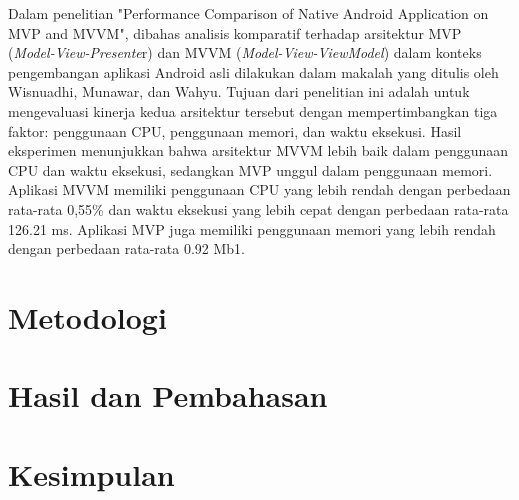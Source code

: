\documentclass[conference]{IEEEtran}
\begin{document}
	Dalam penelitian "Performance Comparison of Native Android Application on MVP and MVVM"\cite{[Perbandingan3]}, dibahas analisis komparatif terhadap arsitektur MVP (\textit{Model-View-Presente}r) dan MVVM (\textit{Model-View-ViewModel}) dalam konteks pengembangan aplikasi Android asli dilakukan dalam makalah yang ditulis oleh Wisnuadhi, Munawar, dan Wahyu. Tujuan dari penelitian ini adalah untuk mengevaluasi kinerja kedua arsitektur tersebut dengan mempertimbangkan tiga faktor: penggunaan CPU, penggunaan memori, dan waktu eksekusi. Hasil eksperimen menunjukkan bahwa arsitektur MVVM lebih baik dalam penggunaan CPU dan waktu eksekusi, sedangkan MVP unggul dalam penggunaan memori. Aplikasi MVVM memiliki penggunaan CPU yang lebih rendah dengan perbedaan rata-rata 0,55\% dan waktu eksekusi yang lebih cepat dengan perbedaan rata-rata 126.21 ms. Aplikasi MVP juga memiliki penggunaan memori yang lebih rendah dengan perbedaan rata-rata 0.92 Mb1.
	
	
	\section{Metodologi}
	
	
	\section{Hasil dan Pembahasan}
	
	
	\section{Kesimpulan}
	
	
	
	\vspace{12pt}
	
\end{document}
